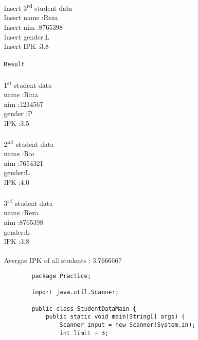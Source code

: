 \documentclass[12pt,titlepage]{article}
\begin{document}
\begin{enumerate}
    \mbox{}\\
    \mbox{}\\ Insert 3\textsuperscript{rd} student data
    \mbox{}\\ Insert name :Reza
    \mbox{}\\ Insert nim :8765398
    \mbox{}\\ Insert gender:L
    \mbox{}\\ Insert IPK :3.8
    \mbox{}\\ 
    \mbox{}\\ \texttt{Result} 
    \mbox{}\\ 
    \mbox{}\\ 1\textsuperscript{st} student data
    \mbox{}\\ name :Rina
    \mbox{}\\ nim :1234567
    \mbox{}\\ gender :P
    \mbox{}\\ IPK :3.5
    \mbox{}\\
    \mbox{}\\ 2\textsuperscript{nd} student data
    \mbox{}\\ name :Rio
    \mbox{}\\ nim :7654321
    \mbox{}\\ gender:L
    \mbox{}\\ IPK :4.0
    \mbox{}\\
    \mbox{}\\ 3\textsuperscript{rd} student data
    \mbox{}\\ name :Reza
    \mbox{}\\ nim :8765398
    \mbox{}\\ gender:L
    \mbox{}\\ IPK :3.8
    \mbox{}\\ 
    \mbox{}\\ Avergae IPK of all students : 3.7666667
    \mbox{}\\ 
    \begin{verbatim}
        package Practice;

        import java.util.Scanner;

        public class StudentDataMain {
            public static void main(String[] args) {
                Scanner input = new Scanner(System.in);
                int limit = 3;


\end{verbatim}
\end{enumerate}
\end{document}
